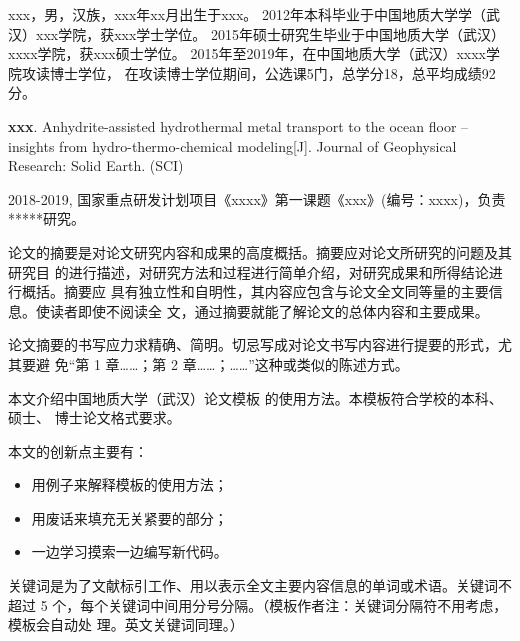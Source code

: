 \begin{CV}
	
	
	xxx，男，汉族，xxx年xx月出生于xxx。
	2012年本科毕业于中国地质大学学（武汉）xxx学院，获xxx学士学位。
	2015年硕士研究生毕业于中国地质大学（武汉）xxxx学院，获xxx硕士学位。
	2015年至2019年，在中国地质大学（武汉）xxxx学院攻读博士学位，
	在攻读博士学位期间，公选课5门，总学分18，总平均成绩92分。
	
	
	\begin{publications}[after=\publicationskip]
		
		\item \textbf{xxx}. Anhydrite-assisted hydrothermal metal transport to the ocean floor – insights from hydro-thermo-chemical modeling[J]. Journal of Geophysical Research: Solid Earth.  (SCI)
		
	\end{publications}
	
	
	\begin{achievements}
		\item 2018-2019, 国家重点研发计划项目《xxxx》第一课题《xxx》(编号：xxxx)，负责*****研究。
		
	\end{achievements}
\end{CV}


\begin{cabstract}
	论文的摘要是对论文研究内容和成果的高度概括。摘要应对论文所研究的问题及其研究目
	的进行描述，对研究方法和过程进行简单介绍，对研究成果和所得结论进行概括。摘要应
	具有独立性和自明性，其内容应包含与论文全文同等量的主要信息。使读者即使不阅读全
	文，通过摘要就能了解论文的总体内容和主要成果。
	
	论文摘要的书写应力求精确、简明。切忌写成对论文书写内容进行提要的形式，尤其要避
	免“第 1 章……；第 2 章……；……”这种或类似的陈述方式。
	
	本文介绍中国地质大学（武汉）论文模板 \cugthesis{} 的使用方法。本模板符合学校的本科、硕士、
	博士论文格式要求。
	
	本文的创新点主要有：
	\begin{itemize}
		\item 用例子来解释模板的使用方法；
		\item 用废话来填充无关紧要的部分；
		\item 一边学习摸索一边编写新代码。
	\end{itemize}
	
	关键词是为了文献标引工作、用以表示全文主要内容信息的单词或术语。关键词不超过 5
	个，每个关键词中间用分号分隔。（模板作者注：关键词分隔符不用考虑，模板会自动处
	理。英文关键词同理。）
\end{cabstract}

